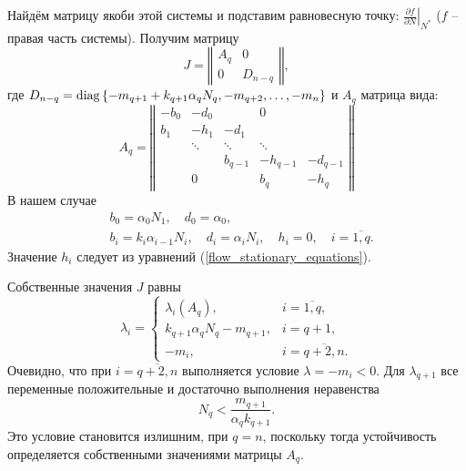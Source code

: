         Найдём матрицу якоби этой системы и подставим равновесную точку: \( \left.\frac{\partial f}{\partial N}\right|_{N^*} \) (\(f\) -- правая часть системы). Получим матрицу
        \begin{equation}
            J = \left\Vert \begin{matrix}
                A_q & 0 \\
                0 & D_{n-q}
            \end{matrix} \right\Vert,
        \end{equation}
        где \(D_{n-q} = \operatorname{diag}\left\{ -m_{q+1} + k_{q+1} \alpha_q N_q, -m_{q+2}, \ldots, -m_{n} \right\}\) и \(A_q\) матрица вида:
        \begin{equation}
            A_q = \left\Vert \begin{matrix}
                   -b_0  & -d_0   &          &     0    & \\
                    b_1  & -h_1   &  -d_1    &          & \\
                         & \ddots & \ddots   &  \ddots  &          \\
                         &        & b_{q-1}  & -h_{q-1} & -d_{q-1} \\
                         &   0    &          & b_{q}    & -h_{q}  
            \end{matrix} \right\Vert
        \end{equation}
        В нашем случае 
        \begin{equation*}
            \begin{split}
                & b_0 = \alpha_0 N_1, \quad d_0 = \alpha_0, \\
                & b_i = k_i \alpha_{i-1} N_i, \quad d_i = \alpha_i N_i, \quad h_i = 0, \quad i=\overline{1,q}.
            \end{split}
        \end{equation*}
        Значение \(h_i\) следует из уравнений (\ref{flow_stationary_equations}).


        Собственные значения \(J\) равны
        \begin{equation*}
            \lambda_i = \left\{ \begin{matrix}
                \lambda_i (A_q), & i=\overline{1,q}, \\
                k_{q+1} \alpha_q N_q - m_{q+1}, & i=q+1, \\
                -m_i, & i=\overline{q+2, n}. 
            \end{matrix} \right.
        \end{equation*}
        Очевидно, что при \(i = \overline{q+2,n}\) выполняется условие \(\lambda = -m_i < 0\). Для \(\lambda_{q+1}\) все переменные положительные и достаточно выполнения неравенства
        \begin{equation} \label{flow_nq_upper}
            N_q < \frac{m_{q+1}}{\alpha_q k_{q+1}}.
        \end{equation}
        Это условие становится излишним, при \(q = n\), поскольку тогда устойчивость определяется собственными значениями матрицы \(A_q\).


